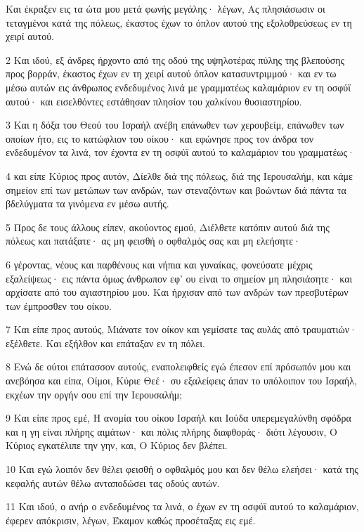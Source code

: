 \par Και έκραξεν εις τα ώτα μου μετά φωνής μεγάλης· λέγων, Ας πλησιάσωσιν οι τεταγμένοι κατά της πόλεως, έκαστος έχων το όπλον αυτού της εξολοθρεύσεως εν τη χειρί αυτού.
\par 2 Και ιδού, εξ άνδρες ήρχοντο από της οδού της υψηλοτέρας πύλης της βλεπούσης προς βορράν, έκαστος έχων εν τη χειρί αυτού όπλον κατασυντριμμού· και εν τω μέσω αυτών εις άνθρωπος ενδεδυμένος λινά με γραμματέως καλαμάριον εν τη οσφύϊ αυτού· και εισελθόντες εστάθησαν πλησίον του χαλκίνου θυσιαστηρίου.
\par 3 Και η δόξα του Θεού του Ισραήλ ανέβη επάνωθεν των χερουβείμ, επάνωθεν των οποίων ήτο, εις το κατώφλιον του οίκου· και εφώνησε προς τον άνδρα τον ενδεδυμένον τα λινά, τον έχοντα εν τη οσφύϊ αυτού το καλαμάριον του γραμματέως·
\par 4 και είπε Κύριος προς αυτόν, Δίελθε διά της πόλεως, διά της Ιερουσαλήμ, και κάμε σημείον επί των μετώπων των ανδρών, των στεναζόντων και βοώντων διά πάντα τα βδελύγματα τα γινόμενα εν μέσω αυτής.
\par 5 Προς δε τους άλλους είπεν, ακούοντος εμού, Διέλθετε κατόπιν αυτού διά της πόλεως και πατάξατε· ας μη φεισθή ο οφθαλμός σας και μη ελεήσητε·
\par 6 γέροντας, νέους και παρθένους και νήπια και γυναίκας, φονεύσατε μέχρις εξαλείψεως· εις πάντα όμως άνθρωπον εφ' ου είναι το σημείον μη πλησιάσητε· και αρχίσατε από του αγιαστηρίου μου. Και ήρχισαν από των ανδρών των πρεσβυτέρων των έμπροσθεν του οίκου.
\par 7 Και είπε προς αυτούς, Μιάνατε τον οίκον και γεμίσατε τας αυλάς από τραυματιών· εξέλθετε. Και εξήλθον και επάταξαν εν τη πόλει.
\par 8 Ενώ δε ούτοι επάτασσον αυτούς, εναπολειφθείς εγώ έπεσον επί πρόσωπόν μου και ανεβόησα και είπα, Οίμοι, Κύριε Θεέ· συ εξαλείφεις άπαν το υπόλοιπον του Ισραήλ, εκχέων την οργήν σου επί την Ιερουσαλήμ;
\par 9 Και είπε προς εμέ, Η ανομία του οίκου Ισραήλ και Ιούδα υπερεμεγαλύνθη σφόδρα και η γη είναι πλήρης αιμάτων· και πόλις πλήρης διαφθοράς· διότι λέγουσιν, Ο Κύριος εγκατέλιπε την γην, και, Ο Κύριος δεν βλέπει.
\par 10 Και εγώ λοιπόν δεν θέλει φεισθή ο οφθαλμός μου και δεν θέλω ελεήσει· κατά της κεφαλής αυτών θέλω ανταποδώσει τας οδούς αυτών.
\par 11 Και ιδού, ο ανήρ ο ενδεδυμένος τα λινά, ο έχων εν τη οσφύϊ αυτού το καλαμάριον, έφερεν απόκρισιν, λέγων, Έκαμον καθώς προσέταξας εις εμέ.

